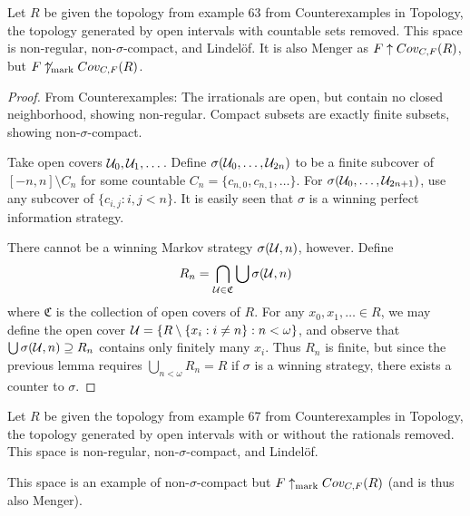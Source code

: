   \begin{example}
  Let $R$ be given the topology from example 63 from Counterexamples in Topology, the topology generated by open intervals with countable sets removed. This space is non-regular, non-$\sigma$-compact, and Lindel\"of. It is also Menger as $F \uparrow Cov_{C,F}(R)$, but $F \not\uparrow_{\text{mark}} Cov_{C,F}(R)$.
  \end{example}

  \begin{proof}
  From Counterexamples: The irrationals are open, but contain no closed neighborhood, showing non-regular. Compact subsets are exactly finite subsets, showing non-$\sigma$-compact.

  Take open covers $\mathcal{U}_0,\mathcal{U}_1,\dots$. Define $\sigma(\mathcal{U}_0,\dots,\mathcal{U}_{2n})$ to be a finite subcover of $[-n,n]\setminus C_n$ for some countable $C_n=\{c_{n,0}, c_{n,1}, \dots\}$. For $\sigma(\mathcal{U}_0,\dots,\mathcal{U}_{2n+1})$, use any subcover of $\{c_{i,j} : i,j < n\}$. It is easily seen that $\sigma$ is a winning perfect information strategy.

  There cannot be a winning Markov strategy $\sigma(\mathcal{U},n)$, however. Define 
      \[
        R_n = \bigcap_{\mathcal{U}\in\mathfrak{C}} \bigcup\sigma(\mathcal{U},n)
      \]
  where $\mathfrak{C}$ is the collection of open covers of $R$. For any $x_0,x_1,\dots \in R$, we may define the open cover $\mathcal{U} = \{R \setminus \{x_i: i \not= n\} : n < \omega \}$, and observe that $\bigcup \sigma(\mathcal{U},n) \supseteq R_n$ contains only finitely many $x_i$. Thus $R_n$ is finite, but since the previous lemma requires $\bigcup_{n<\omega} R_n = R$ if $\sigma$ is a winning strategy, there exists a counter to $\sigma$.
  \end{proof}

  \begin{example}
  Let $R$ be given the topology from example 67 from Counterexamples in Topology, the topology generated by open intervals with or without the rationals removed. This space is non-regular, non-$\sigma$-compact, and Lindel\"of.

  This space is an example of non-$\sigma$-compact but $F \uparrow_{\text{mark}} Cov_{C,F}(R)$ (and is thus also Menger).
  \end{example}

